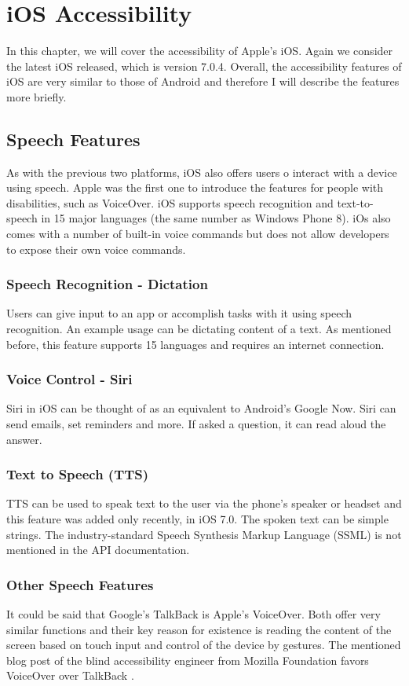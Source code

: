\section{iOS Accessibility}
In this chapter, we will cover the accessibility of Apple's iOS. Again we consider the latest iOS released, which is version 7.0.4. Overall, the accessibility features of iOS are very similar to those of Android and therefore I will describe the features more briefly.
\subsection{Speech Features}
As with the previous two platforms, iOS also offers users o interact with a device using speech. Apple was the first one to introduce the features for people with disabilities, such as VoiceOver. iOS supports speech recognition and text-to-speech in 15 major languages (the same number as Windows Phone 8).
iOs also comes with a number of built-in voice commands but does not allow developers to expose their own voice commands.
\subsubsection{Speech Recognition - Dictation}
Users can give input to an app or accomplish tasks with it using speech recognition. An example usage can be dictating content of a text. As mentioned before, this feature supports 15 languages and requires an internet connection.
\subsubsection{Voice Control - Siri}
Siri in iOS can be thought of as an equivalent to Android's Google Now. Siri can send emails, set reminders and more. If asked a question, it can read aloud the answer. 
\subsubsection{Text to Speech (TTS)}
TTS can be used to speak text to the user via the phone's speaker or headset and this feature was added only recently, in iOS 7.0. The spoken text can be simple strings. The industry-standard Speech Synthesis Markup Language (SSML) is not mentioned in the API documentation.
\subsubsection{Other Speech Features}
It could be said that Google's TalkBack is Apple's VoiceOver. Both offer very similar functions and their key reason for existence is reading the content of the screen based on touch input and control of the device by gestures.
The mentioned blog post of the blind accessibility engineer from Mozilla Foundation favors VoiceOver over TalkBack \cite{mozillaguy}.

